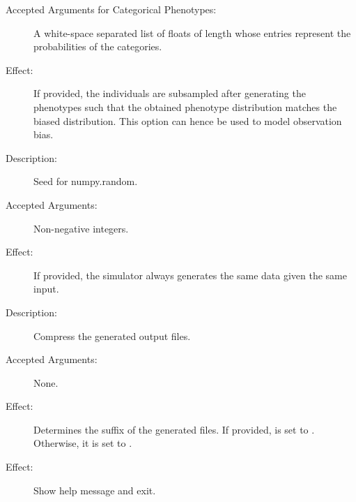 \documentclass[a4paper,10pt,english]{sphinxhowto}
\begin{document}
\begin{description}
\begin{description}
\begin{description}
\item[{Accepted Arguments for Categorical Phenotypes:}] \leavevmode
A white-space separated list of floats of length  whose entries represent the probabilities of the 
categories.

\item[{Effect:}] \leavevmode
If provided, the individuals are subsampled after generating the phenotypes such that the obtained phenotype distribution
matches the biased distribution. This option can hence be used to model observation bias.

\end{description}

\item[{\sphinxcode{\sphinxupquote{-{-}seed SEED}}}] \leavevmode\begin{description}
\item[{Description:}] \leavevmode
Seed for numpy.random.

\item[{Accepted Arguments:}] \leavevmode
Non-negative integers.

\item[{Effect:}] \leavevmode
If provided, the simulator always generates the same data given the same input.

\end{description}

\item[{\sphinxcode{\sphinxupquote{-{-}compress}}}] \leavevmode\begin{description}
\item[{Description:}] \leavevmode
Compress the generated output files.

\item[{Accepted Arguments:}] \leavevmode
None.

\item[{Effect:}] \leavevmode
Determines the suffix  of the generated files. If provided,  is set to .
Otherwise, it is set to .

\end{description}

\item[{\sphinxcode{\sphinxupquote{-h, -{-}help}}}] \leavevmode\begin{description}
\item[{Effect:}] \leavevmode
Show help message and exit.


\end{description}
\end{description}
\end{description}
\end{document}
